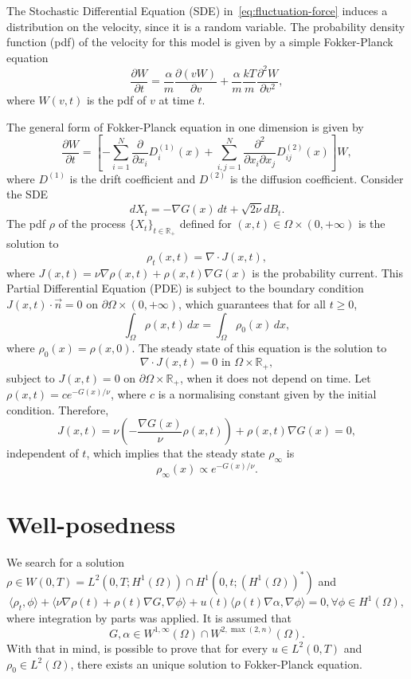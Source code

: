 \documentclass[12pt]{article}
\newcommand{\R}{\mathbb{R}}
\newcommand{\n}{\vec{n}}
\newcommand{\steady}{\rho_{\infty}}
\newcommand{\inner}[2]{\langle{} #1, #2 \rangle{}}
\theoremstyle{definition}
\begin{document}
The Stochastic Differential Equation (SDE) in~\eqref{eq:fluctuation-force} induces a distribution on the velocity, since it is a random variable.
The probability density function (pdf) of the velocity for this model is given by a simple Fokker-Planck equation 
\[
\frac{\partial W}{\partial t} = \frac{\alpha}{m} \frac{\partial (v W)}{\partial v} + \frac{\alpha}{m} \frac{kT}{m} \frac{\partial^2 W}{\partial v^2},
\]
where $W(v,t)$ is the pdf of $v$ at time $t$.

The general form of Fokker-Planck equation in one dimension is given by 
\begin{equation}
    \label{eq:fokker-planck-1d}
    \frac{\partial W}{\partial t} = \left[-\sum_{i=1}^N \frac{\partial}{\partial x_i} D_i^{(1)}(x) + \sum_{i,j=1}^N \frac{\partial^2}{\partial x_i \partial x_j} D_{ij}^{(2)}(x)\right]W,
\end{equation}
where $D^{(1)}$ is the drift coefficient and $D^{(2)}$ is the diffusion coefficient.
Consider the SDE
\[
dX_t = -\nabla G(x) \, dt + \sqrt{2\nu} dB_t.
\]
The pdf $\rho$ of the process ${\{X_t\}}_{t \in \R_+}$ defined for $(x,t) \in \Omega \times (0,+\infty)$ is the solution to 
\[
\rho_t(x,t) = \nabla \cdot J(x,t),
\]
where $J(x,t) = \nu \nabla \rho(x,t) + \rho(x,t) \nabla G(x)$ is the probability current. 
This Partial Differential Equation (PDE) is subject to the boundary condition $J(x,t) \cdot \n = 0$ on $\partial \Omega \times (0,+\infty)$, which guarantees that for all $t \ge 0$,
\[
\int_{\Omega} \rho(x,t) \, dx = \int_{\Omega} \rho_0(x) \, dx,
\]
where $\rho_0(x) = \rho(x,0)$.
The steady state of this equation is the solution to
\[
\nabla \cdot J(x,t) = 0 \text{ in } \Omega \times \R_+,
\]
subject to $J(x,t) = 0 $ on $\partial \Omega \times \R_+$, when it does not depend on time.
Let $\rho(x,t) = c e^{-G(x)/\nu}$, where $c$ is a normalising constant given by the initial condition.
Therefore, 
\[
J(x,t) = \nu \left(-\frac{\nabla G(x)}{\nu} \rho(x,t)\right) + \rho(x,t) \nabla G(x) = 0,
\]
independent of $t$, which implies that the steady state $\steady$ is 
\[
\steady(x) \propto e^{-G(x)/\nu}.
\]

\section{Well-posedness}

We search for a solution $\rho \in W(0,T) = L^2(0,T; H^1(\Omega)) \cap H^1(0, t; {(H^1(\Omega))}^*)$ and 
\[
\inner{\rho_t}{\phi} + \inner{\nu\nabla \rho(t) + \rho(t)\nabla G}{\nabla \phi} + u(t)\inner{\rho(t)\nabla \alpha}{\nabla \phi} = 0, \forall \phi \in H^1(\Omega),
\]
where integration by parts was applied.
It is assumed that 
\[
G, \alpha \in W^{1,\infty}(\Omega) \cap W^{2,\max(2,n)}(\Omega).
\]
With that in mind, is possible to prove that for every $u \in L^2(0,T)$ and $\rho_0 \in L^2(\Omega)$, there exists an unique solution to Fokker-Planck equation.
\end{document}
